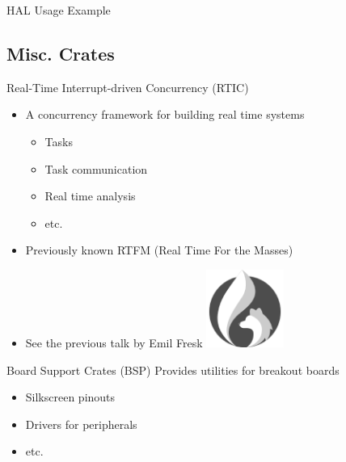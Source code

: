 \documentclass[aspectratio=169]{beamer}
\begin{document}
\begin{frame}{HAL Usage Example}
    
\end{frame}

\begin{frame}
    \section{Misc. Crates}
\end{frame}

\begin{frame}{Real-Time Interrupt-driven Concurrency (RTIC)}
    \begin{itemize}
        \item A concurrency framework for building real time systems
        \begin{itemize}
            \item Tasks
            \item Task communication
            \item Real time analysis
            \item etc.
        \end{itemize}
        \item Previously known RTFM (Real Time For the Masses)
        \item{See the previous talk by Emil Fresk}
        \hspace*{7cm}\includegraphics[width=0.2\textwidth]{fig/rtic.png}
    \end{itemize}
\end{frame}

\begin{frame}{Board Support Crates (BSP)}
    Provides utilities for breakout boards

    \begin{itemize}
        \item Silkscreen pinouts
        \item Drivers for peripherals
        \item etc.
    \end{itemize}
\end{frame}
\end{document}
